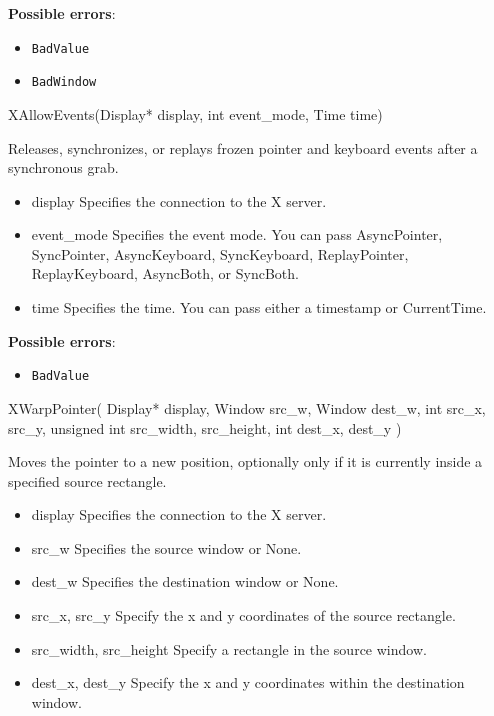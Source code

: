 \documentclass{report}
\begin{document}
\begin{itemize}
        \textbf{Possible errors}:
        \begin{itemize}
            \item \texttt{BadValue}
            \item \texttt{BadWindow}
        \end{itemize}

        \begin{cppcode}
        XAllowEvents(Display* display, int event_mode, Time time)
        \end{cppcode}
        \bigbreak \noindent
        Releases, synchronizes, or replays frozen pointer and keyboard events after a synchronous grab.
        \begin{itemize}
            \item display Specifies the connection to the X server.
            \item event\_mode Specifies the event mode. You can pass AsyncPointer, SyncPointer, AsyncKeyboard, SyncKeyboard, ReplayPointer, ReplayKeyboard, AsyncBoth, or SyncBoth.
            \item time Specifies the time. You can pass either a timestamp or CurrentTime.
        \end{itemize}
        \textbf{Possible errors}:
        \begin{itemize}
            \item \texttt{BadValue}
        \end{itemize}

        \begin{cppcode}
            XWarpPointer(
                Display* display,
                Window src_w,
                Window dest_w,
                int src_x, src_y,
                unsigned int src_width, src_height,
                int dest_x, dest_y
            )
        \end{cppcode}
        \bigbreak \noindent
        Moves the pointer to a new position, optionally only if it is currently inside a specified source rectangle.

        \begin{itemize}
            \item display Specifies the connection to the X server.
            \item src\_w Specifies the source window or None.
            \item dest\_w Specifies the destination window or None.
            \item src\_x, src\_y Specify the x and y coordinates of the source rectangle.
            \item src\_width, src\_height Specify a rectangle in the source window.
            \item dest\_x, dest\_y Specify the x and y coordinates within the destination window.
        \end{itemize}


\end{itemize}
\end{document}
